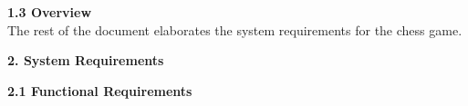\documentclass{article}
\begin{document}
\begin{flushleft}
\begin{itemize}
\end{itemize}

\vspace{5mm}
\textbf{1.3	Overview}\\
\vspace{1mm}
The rest of the document elaborates the system requirements for the chess game.\\
\vspace{10mm}

\begin{Large}\textbf{2.	System Requirements}\\
\end{Large}
\vspace{3mm}
\textbf{2.1	Functional Requirements}\\
\begin{itemize}
	 

\end{itemize}
\end{flushleft}
\end{document}
